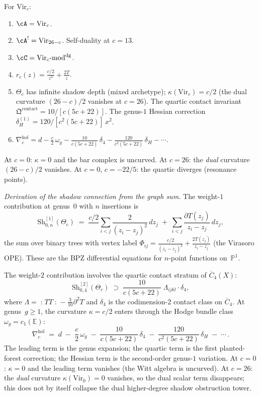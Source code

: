 \begin{computation}
\label{comp:virasoro-holographic-datum}
For $\mathrm{Vir}_c$:
\begin{enumerate}[label=\textup{(\roman*)}]
\item $\cA = \mathrm{Vir}_c$.
\item $\cA^! = \mathrm{Vir}_{26-c}$. Self-duality at $c=13$.
\item $\cC = \mathrm{Vir}_c\text{-mod}^{\mathrm{dg}}$.
\item $r_c(z) = \frac{c/2}{z^3} + \frac{2T}{z}$.
\item $\Theta_c$ has infinite shadow depth (mixed archetype);
 $\kappa(\mathrm{Vir}_c) = c/2$ (the dual curvature $(26-c)/2$ vanishes at $c = 26$). The quartic contact
 invariant
 $\mathfrak Q^{\mathrm{contact}} = 10/[c(5c+22)]$.
 The genus-$1$ Hessian correction
 $\delta_H^{(1)} = 120/[c^2(5c+22)]\,x^2$.
\item $\nabla^{\mathrm{hol}}_c =
 d - \frac{c}{2}\,\omega_g
 - \frac{10}{c(5c+22)}\,\delta_4
 - \frac{120}{c^2(5c+22)}\,\delta_H - \cdots$.
\end{enumerate}
At $c=0$: $\kappa=0$ and the bar complex is uncurved.
At $c=26$: the \emph{dual} curvature $(26-c)/2$ vanishes.
At $c=0$, $c=-22/5$: the quartic diverges (resonance points).

\emph{Derivation of the shadow connection from the graph sum.}
The weight-$1$ contribution at genus~$0$ with $n$ insertions is
\[
\mathrm{Sh}^{[1]}_{0,n}(\Theta_c)
\;=\;
\frac{c/2}{}\sum_{i<j}
\frac{2}{(z_i-z_j)^2}\,dz_j
\;+\;
\sum_{i<j}\frac{\partial T(z_j)}{z_i-z_j}\,dz_j,
\]
the sum over binary trees with vertex label
$\Phi_{ij}=\frac{c/2}{(z_i-z_j)^2}+\frac{2T(z_j)}{z_i-z_j}$
(the Virasoro OPE). These are the BPZ differential equations
for $n$-point functions on~$\mathbb{P}^1$.

The weight-$2$ contribution involves the quartic contact stratum
of $\overline{C}_4(X)$:
\[
\mathrm{Sh}^{[2]}_{0,4}(\Theta_c)
\;\supset\;
\frac{10}{c(5c+22)}\;\Lambda_{ijkl}\cdot\delta_4,
\]
where $\Lambda=\mathopen{:}TT\mathclose{:}-\tfrac{3}{10}\partial^2 T$
and $\delta_4$ is the codimension-$2$ contact class on
$\overline{C}_4$. At genus~$g\ge 1$, the curvature
$\kappa=c/2$ enters through the Hodge bundle class
$\omega_g=c_1(\mathbb E)$:
\[
\nabla^{\mathrm{hol}}_c
\;=\;
d
\;-\;\frac{c}{2}\,\omega_g
\;-\;\frac{10}{c(5c+22)}\,\delta_4
\;-\;\frac{120}{c^2(5c+22)}\,\delta_H
\;-\;\cdots\,.
\]
The leading term is the genus expansion; the quartic term is
the first planted-forest correction; the Hessian term is the
second-order genus-$1$ variation. At $c=0$: $\kappa=0$ and
the leading term vanishes (the Witt algebra is uncurved).
At $c=26$: the \emph{dual} curvature $\kappa(\mathrm{Vir}_0)=0$
vanishes, so the dual scalar term disappears; this does not by itself
collapse the dual higher-degree shadow obstruction tower.


\end{computation}

